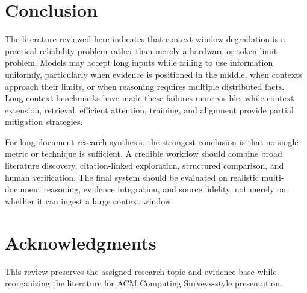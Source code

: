 \documentclass[manuscript,screen,oneside]{acmart}
\begin{document}
\section{Conclusion}\label{sec:conclusion}
The literature reviewed here indicates that context-window degradation is a practical reliability problem rather than merely a hardware or token-limit problem. Models may accept long inputs while failing to use information uniformly, particularly when evidence is positioned in the middle, when contexts approach their limits, or when reasoning requires multiple distributed facts. Long-context benchmarks have made these failures more visible, while context extension, retrieval, efficient attention, training, and alignment provide partial mitigation strategies.

For long-document research synthesis, the strongest conclusion is that no single metric or technique is sufficient. A credible workflow should combine broad literature discovery, citation-linked exploration, structured comparison, and human verification. The final system should be evaluated on realistic multi-document reasoning, evidence integration, and source fidelity, not merely on whether it can ingest a large context window.

\section*{Acknowledgments}
This review preserves the assigned research topic and evidence base while reorganizing the literature for ACM Computing Surveys-style presentation.

\nocite{*}


\end{document}
